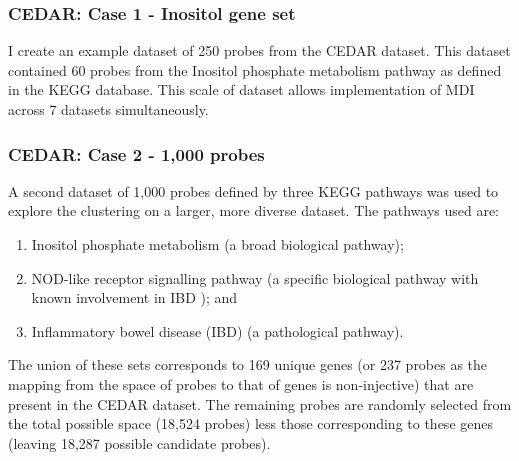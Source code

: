 \documentclass[12pt]{article} %
\begin{document}
	 

	\subsubsection{CEDAR: Case 1 - Inositol gene set} \label{sec:case_studies:cedar:dataset_1}

	I create an example dataset of 250 probes from the CEDAR dataset. This dataset contained 60 probes from the Inositol phosphate metabolism pathway as defined in the KEGG database. This scale of dataset allows implementation of MDI across 7 datasets simultaneously.
	
	\subsubsection{CEDAR: Case 2 - 1,000 probes} \label{sec:case_studies:cedar:dataset_2}
	
	A second dataset of 1,000 probes defined by three KEGG pathways was used to explore the clustering on a larger, more diverse dataset. The pathways used are:
	
	\begin{enumerate} \label{list:kegg_pathways}
		\item Inositol phosphate metabolism (a broad biological pathway);
		\item NOD-like receptor signalling pathway (a specific biological pathway with known involvement in IBD \cite{CarneiroNodlikeproteinsinflammation2008}\cite{GarrettHomeostasisInflammationIntestine2010}); and
		\item Inflammatory bowel disease (IBD) (a pathological pathway).
	\end{enumerate}

	The union of these sets corresponds to 169 unique genes (or 237 probes as the mapping from the space of probes to that of genes is non-injective) that are present in the CEDAR dataset. The remaining probes are randomly selected from the total possible space (18,524 probes) less those corresponding to these genes (leaving 18,287 possible candidate probes).
\end{document}
